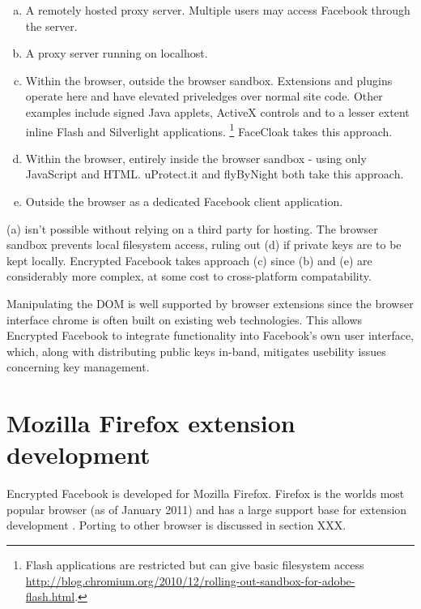 \begin{enumerate}[(a)]
    
    \item A remotely hosted proxy server. Multiple users may access Facebook through the server.
    
    \item A proxy server running on localhost.
    
    \item Within the browser, outside the browser sandbox. Extensions and plugins operate here and have elevated priveledges over normal site code. Other examples include signed Java applets, ActiveX controls and to a lesser extent inline Flash and Silverlight applications. \footnote{Flash applications are restricted but can give basic filesystem access \url{http://blog.chromium.org/2010/12/rolling-out-sandbox-for-adobe-flash.html}.} FaceCloak takes this approach.
    
    \item Within the browser, entirely inside the browser sandbox - using only JavaScript and HTML. uProtect.it and flyByNight both take this approach.
    
    \item Outside the browser as a dedicated Facebook client application.
    
\end{enumerate}
   
(a) isn't possible without relying on a third party for hosting. The browser sandbox prevents local filesystem access, ruling out (d) if private keys are to be kept locally. Encrypted Facebook takes approach (c) since (b) and (e) are considerably more complex, at some cost to cross-platform compatability.

Manipulating the \ac{DOM} is well supported by browser extensions since the browser interface chrome is often built on existing web technologies. This allows Encrypted Facebook to integrate functionality into Facebook's own user interface, which, along with distributing public keys in-band, mitigates usebility issues concerning key management.

\section{Mozilla Firefox extension development}

Encrypted Facebook is developed for Mozilla Firefox. Firefox is the worlds most popular browser (as of January 2011) and has a large support base for extension development \cite{ffox}. Porting to other browser is discussed in section XXX.

